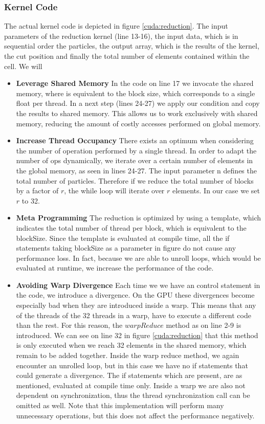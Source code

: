 \documentclass[]{article}
\begin{document}
\subsubsection{Kernel Code}\label{sec:countleftcode}
The actual kernel code is depicted in figure \ref{cuda:reduction}. The input parameters of the reduction kernel (line 13-16), the input data, which is in sequential order the particles, the output array, which is the results of the kernel, the cut position and finally the total number of elements contained within the cell. 
We will 
\begin{itemize}
	\item \textbf{Leverage Shared Memory} 
	In the code on line 17 we invocate the shared memory, where is equivalent to the block size, which corresponds to a single float per thread. In a next step (lines 24-27) we apply our condition and copy the results to shared memory. This allows us to work exclusively with shared memory, reducing the amount of costly accesses performed on global memory.
	
	\item \textbf{Increase Thread Occupancy} There exists an optimum when considering the number of operation performed by a single thread. In order to adapt the number of ops dynamically, we iterate over a certain number of elements in the global memory, as seen in lines 24-27. The input parameter n defines the total number of particles. Therefore if we reduce the total number of blocks by a factor of $r$, the while loop will iterate over $r$ elements. In our case we set $r$ to 32. 
	
	\item \textbf{Meta Programming} The reduction is optimized by using a template, which indicates the total number of thread per block, which is equivalent to the blockSize. Since the template is evaluated at compile time, all the if statements taking blockSize as a parameter in figure do not cause any performance loss. In fact, because we are able to unroll loops, which would be evaluated at runtime, we increase the performance of the code. 
	
	\item \textbf{Avoiding Warp Divergence} Each time we we have an control statement in the code, we introduce a divergence. On the GPU these divergences become especially bad when they are introduced inside a warp. This means that any of the threads of the 32 threads in a warp, have to execute a different code than the rest. For this reason, the $warpReduce$ method as on line 2-9 is introduced. We can see on line 32 in figure \ref{cuda:reduction} that this method is only executed when we reach 32 elements in the shared memory, which remain to be added together. Inside the warp reduce method, we again encounter an unrolled loop, but in this case we have no if statements that could generate a divergence. The if statements which are present, are as mentioned, evaluated at compile time only. Inside a warp we are also not dependent on synchronization, thus the thread synchronization call can be omitted as well. Note that this implementation will perform many unnecessary operations, but this does not affect the performance negatively.
	

\end{itemize}
\end{document}
